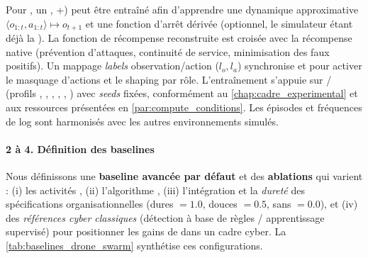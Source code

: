 Pour , un , +) peut être entraîné afin d'apprendre une dynamique approximative $\langle o_{1:t}, a_{1:t} \rangle \mapsto o_{t+1}$ et une fonction d'arrêt dérivée (optionnel, le simulateur étant déjà la ). La fonction de récompense reconstruite est croisée avec la récompense native (prévention d'attaques, continuité de service, minimisation des faux positifs). Un mappage \emph{labels} observation/action ($l_o, l_a$) synchronise  et  pour activer le masquage d'actions et le shaping par rôle. L'entraînement s'appuie sur / (profils , , , , , ) avec \textit{seeds} fixées, conformément au \autoref{chap:cadre_experimental} et aux ressources présentées en \autoref{par:compute_conditions}. Les épisodes et fréquences de log sont harmonisés avec les autres environnements simulés.

\paragraph{2 à 4. Définition des baselines}

Nous définissons une \textbf{baseline avancée par défaut} et des \textbf{ablations} qui varient : (i) les activités , (ii) l'algorithme , (iii) l'intégration et la \textit{dureté} des spécifications organisationnelles (dures $=1.0$, douces $=0.5$, sans $=0.0$), et (iv) des \textit{références cyber classiques} (détection à base de règles / apprentissage supervisé) pour positionner les gains de  dans un cadre cyber. La \autoref{tab:baselines_drone_swarm} synthétise ces configurations.


